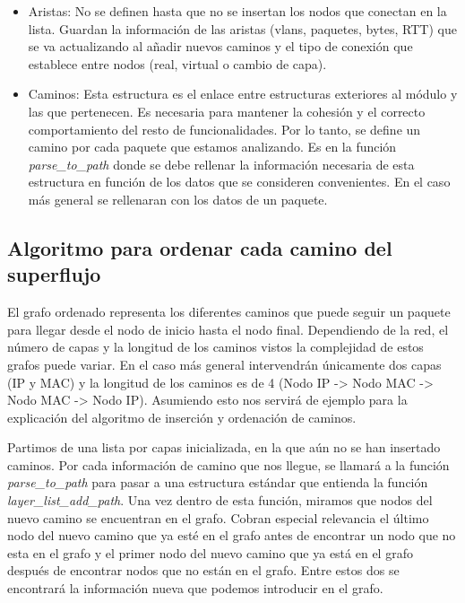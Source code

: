 \documentclass[twoside, 12pt]{epstfg}
\begin{document}
\begin{itemize}
    \item Aristas: No se definen hasta que no se insertan los nodos que conectan en la lista. Guardan la información de las aristas (vlans, paquetes, bytes, RTT) que se va actualizando al añadir nuevos caminos y el tipo de conexión que establece entre nodos (real, virtual o cambio de capa).
    \item Caminos: Esta estructura es el enlace entre estructuras exteriores al módulo y las que pertenecen. Es necesaria para mantener la cohesión y el correcto comportamiento del resto de funcionalidades. Por lo tanto, se define un camino por cada paquete que estamos analizando. Es en la función \textit{parse\_to\_path} donde se debe rellenar la información necesaria de esta estructura en función de los datos que se consideren convenientes. En el caso más general se rellenaran con los datos de un paquete.
\end{itemize}

\subsection{Algoritmo para ordenar cada camino del superflujo}
El grafo ordenado representa los diferentes caminos que puede seguir un paquete para llegar desde el nodo de inicio hasta el nodo final. Dependiendo de la red, el número de capas y la longitud de los caminos vistos la complejidad de estos grafos puede variar. En el caso más general intervendrán únicamente dos capas (IP y MAC) y la longitud de los caminos es de 4 (Nodo IP -> Nodo MAC -> Nodo MAC -> Nodo IP). Asumiendo esto nos servirá de ejemplo para la explicación del algoritmo de inserción y ordenación de caminos.

Partimos de una lista por capas inicializada, en la que aún no se han insertado caminos. Por cada información de camino que nos llegue, se llamará a la función \textit{parse\_to\_path} para pasar a una estructura estándar que entienda la función \textit{layer\_list\_add\_path}. Una vez dentro de esta función, miramos que nodos del nuevo camino se encuentran en el grafo. Cobran especial relevancia el último nodo del nuevo camino que ya esté en el grafo antes de encontrar un nodo que no esta en el grafo y el primer nodo del nuevo camino que ya está en el grafo después de encontrar nodos  que no están en el grafo. Entre estos dos se encontrará la información nueva que podemos introducir en el grafo.
\end{document}
